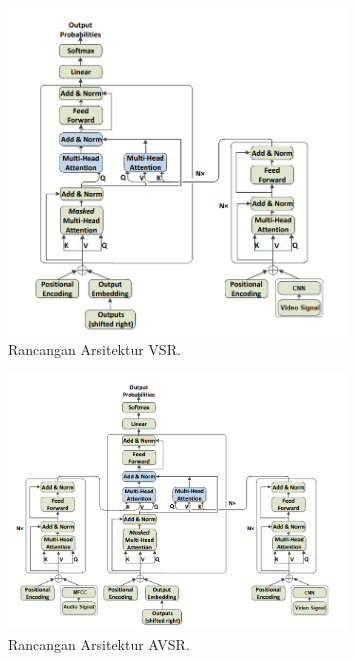 \begin{figure}[h]
    \centering
    \includegraphics[width=0.8\textwidth]{resources/images/usulan-arsitektur-vsr.png}
    \caption{Rancangan Arsitektur VSR.}
    \label{fig:usulan-arsitektur-vsr}
\end{figure}

\begin{figure}[h]
    \centering
    \includegraphics[width=0.8\textwidth]{resources/images/usulan-arsitektur-avsr.png}
    \caption{Rancangan Arsitektur AVSR.}
    \label{fig:usulan-arsitektur-avsr}
\end{figure}

